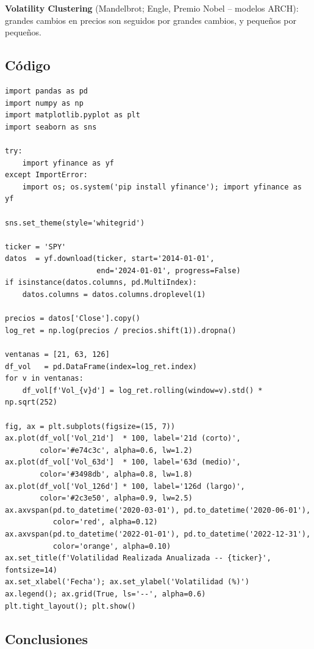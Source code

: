 \documentclass[12pt,letterpaper]{article}
\begin{document}
\textbf{Volatility Clustering} (Mandelbrot; Engle, Premio Nobel -- modelos ARCH):
grandes cambios en precios son seguidos por grandes cambios, y peque\~nos por peque\~nos.

\subsection{C\'odigo}

\begin{lstlisting}[style=python, caption={Laboratorio 2 -- Volatilidad realizada}]
import pandas as pd
import numpy as np
import matplotlib.pyplot as plt
import seaborn as sns

try:
    import yfinance as yf
except ImportError:
    import os; os.system('pip install yfinance'); import yfinance as yf

sns.set_theme(style='whitegrid')

ticker = 'SPY'
datos  = yf.download(ticker, start='2014-01-01',
                     end='2024-01-01', progress=False)
if isinstance(datos.columns, pd.MultiIndex):
    datos.columns = datos.columns.droplevel(1)

precios = datos['Close'].copy()
log_ret = np.log(precios / precios.shift(1)).dropna()

ventanas = [21, 63, 126]
df_vol   = pd.DataFrame(index=log_ret.index)
for v in ventanas:
    df_vol[f'Vol_{v}d'] = log_ret.rolling(window=v).std() * np.sqrt(252)

fig, ax = plt.subplots(figsize=(15, 7))
ax.plot(df_vol['Vol_21d']  * 100, label='21d (corto)',
        color='#e74c3c', alpha=0.6, lw=1.2)
ax.plot(df_vol['Vol_63d']  * 100, label='63d (medio)',
        color='#3498db', alpha=0.8, lw=1.8)
ax.plot(df_vol['Vol_126d'] * 100, label='126d (largo)',
        color='#2c3e50', alpha=0.9, lw=2.5)
ax.axvspan(pd.to_datetime('2020-03-01'), pd.to_datetime('2020-06-01'),
           color='red', alpha=0.12)
ax.axvspan(pd.to_datetime('2022-01-01'), pd.to_datetime('2022-12-31'),
           color='orange', alpha=0.10)
ax.set_title(f'Volatilidad Realizada Anualizada -- {ticker}', fontsize=14)
ax.set_xlabel('Fecha'); ax.set_ylabel('Volatilidad (%)')
ax.legend(); ax.grid(True, ls='--', alpha=0.6)
plt.tight_layout(); plt.show()
\end{lstlisting}

\subsection{Conclusiones}
\end{document}
